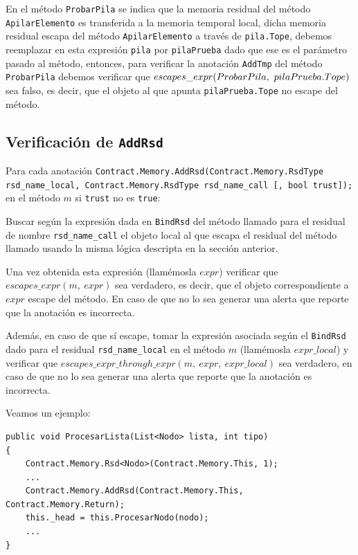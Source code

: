 \documentclass[12pt,a4paper]{article}
\newcommand\mono[1]{\texttt{#1}}
\begin{document}
		En el método \mono{ProbarPila} se indica que la memoria residual del método \mono{ApilarElemento} es transferida a la memoria temporal local, dicha memoria residual escapa del método \mono{ApilarElemento} a través de \mono{pila.Tope}, debemos reemplazar en esta expresión \mono{pila} por \mono{pilaPrueba} dado que ese es el parámetro pasado al método, entonces, para verificar la anotación \mono{AddTmp} del método \mono{ProbarPila} debemos verificar que $escapes\_expr(ProbarPila,\\ \ pilaPrueba.Tope)$ sea falso, es decir, que el objeto al que apunta \mono{pilaPrueba.Tope} no escape del método.

		\subsection{Verificación de \mono{AddRsd}}
			Para cada anotación \mono{Contract.Memory.AddRsd(Contract.Memory.RsdType \\ rsd\_name\_local, Contract.Memory.RsdType rsd\_name\_call [, bool trust]);} en el método $m$ si \mono{trust} no es \mono{true}:

			Buscar según la expresión dada en \mono{BindRsd} del método llamado para el residual de nombre \mono{rsd\_name\_call} el objeto local al que escapa el residual del método llamado usando la misma lógica descripta en la sección anterior.

			Una vez obtenida esta expresión (llamémosla $expr$) verificar que $escapes\_expr(m,\ expr)$ sea verdadero, es decir, que el objeto correspondiente a $expr$ escape del método. En caso de que no lo sea generar una alerta que reporte que la anotación es incorrecta.

			Además, en caso de que sí escape, tomar la expresión asociada según el \mono{BindRsd} dado para el residual \mono{rsd\_name\_local} en el método $m$ (llamémosla $expr\_local$) y verificar que $escapes\_expr\_through\_expr(m,\ expr,\ expr\_local)$ sea verdadero, en caso de que no lo sea generar una alerta que reporte que la anotación es incorrecta.

			\noindent Veamos un ejemplo:
			\vspace{5pt}
			\begin{footnotesize}
			\begin{lstlisting}[caption=Ejemplo de verificación de \mono{AddRsd}]
public void ProcesarLista(List<Nodo> lista, int tipo)
{
	Contract.Memory.Rsd<Nodo>(Contract.Memory.This, 1);
	...
	Contract.Memory.AddRsd(Contract.Memory.This, Contract.Memory.Return);
	this._head = this.ProcesarNodo(nodo);
	...
}
			\end{lstlisting}
			\end{footnotesize}
\end{document}
